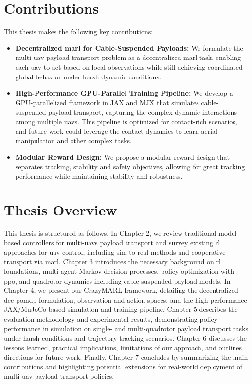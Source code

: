 \section{Contributions}
This thesis makes the following key contributions:
\begin{itemize}
    \item \textbf{Decentralized \gls{marl} for Cable-Suspended Payloads:} We formulate the multi-\gls{uav} payload transport problem as a decentralized \gls{marl} task, enabling each \gls{uav} to act based on local observations while still achieving coordinated global behavior under harsh dynamic conditions.
    \item \textbf{High-Performance GPU-Parallel Training Pipeline:} We develop a GPU-parallelized framework in JAX and MJX that simulates cable-suspended payload transport, capturing the complex dynamic interactions among multiple \glspl{uav}. This pipeline is optimized for contact-rich scenarios, and future work could leverage the contact dynamics to learn aerial manipulation and other complex tasks.
    \item \textbf{Modular Reward Design:} We propose a modular reward design that separates tracking, stability and safety objectives, allowing for great tracking performance while maintaining stability and robustness. 
\end{itemize}

\section{Thesis Overview}
This thesis is structured as follows. In Chapter 2, we review traditional model-based controllers for multi-\glspl{uav} payload transport and survey existing \gls{rl} approaches for \gls{uav} control, including sim-to-real methods and cooperative transport via \gls{marl}. Chapter 3 introduces the necessary background on \gls{rl} foundations, multi-agent Markov decision processes, policy optimization with \gls{ppo}, and quadrotor dynamics including cable-suspended payload models. In Chapter 4, we present our CrazyMARL framework, detailing the decentralized \gls{dec-pomdp} formulation, observation and action spaces, and the high-performance JAX/MuJoCo-based simulation and training pipeline. Chapter 5 describes the evaluation methodology and experimental results, demonstrating policy performance in simulation on single- and multi-quadrotor payload transport tasks under harsh conditions and trajectory tracking scenarios. Chapter 6 discusses the lessons learned, practical implications, limitations of our approach, and outlines directions for future work. Finally, Chapter 7 concludes by summarizing the main contributions and highlighting potential extensions for real-world deployment of multi-\gls{uav} payload transport policies.
